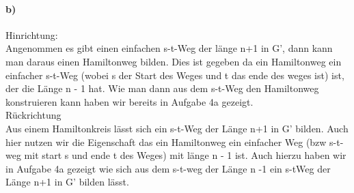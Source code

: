 \documentclass[a4paper]{article}
\begin{document}
\paragraph{b)}
Hinrichtung: \\
Angenommen es gibt einen einfachen s-t-Weg der länge n+1 in G', dann kann 
man daraus einen Hamiltonweg bilden. Dies ist gegeben da ein Hamiltonweg 
ein einfacher s-t-Weg (wobei s der Start des Weges und t das ende des weges ist)
ist, der die Länge n - 1 hat. Wie man dann aus dem 
s-t-Weg den Hamiltonweg konstruieren kann haben wir bereits in Aufgabe 4a 
gezeigt. \\
Rückrichtung \\
Aus einem Hamiltonkreis lässt sich ein s-t-Weg der Länge n+1 in G' bilden.
Auch hier nutzen wir die Eigenschaft das ein Hamiltonweg ein einfacher Weg
(bzw s-t-weg mit start s und ende t des Weges) mit länge n - 1 ist. Auch 
hierzu haben wir in Aufgabe 4a gezeigt wie sich aus dem s-t-weg der Länge 
n -1 ein s-tWeg der Länge n+1 in G' bilden lässt.
\end{document}
